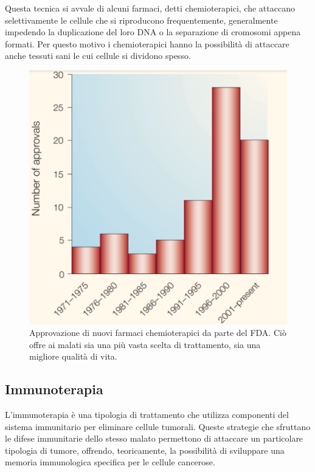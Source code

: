 \documentclass[11pt]{article}
\begin{document}
Questa tecnica si avvale di alcuni farmaci, detti chemioterapici, che attaccano selettivamente le cellule che si riproducono frequentemente, generalmente impedendo la duplicazione del loro DNA o la separazione di cromosomi appena formati. Per questo motivo i chemioterapici hanno la possibilità di attaccare anche tessuti sani le cui cellule si dividono spesso. 

\begin{figure}[H]
	\centering
	\includegraphics[width=0.5\linewidth]{chemioterapia}
	\caption{Approvazione di nuovi farmaci chemioterapici da parte del FDA. Ciò offre ai malati sia una più vasta scelta di trattamento, sia una migliore qualità di vita.\cite{chabner2005chemotherapy}}
	\label{fig:chemioterapia}
\end{figure}


\subsection*{Immunoterapia}


L'immunoterapia è una tipologia di trattamento che utilizza componenti del sistema immunitario per eliminare cellule tumorali. Queste strategie che sfruttano le difese immunitarie dello stesso malato permettono di attaccare un particolare tipologia di tumore, offrendo, teoricamente, la possibilità di sviluppare una memoria immunologica specifica per le cellule cancerose.\cite{bworld}
\end{document}
